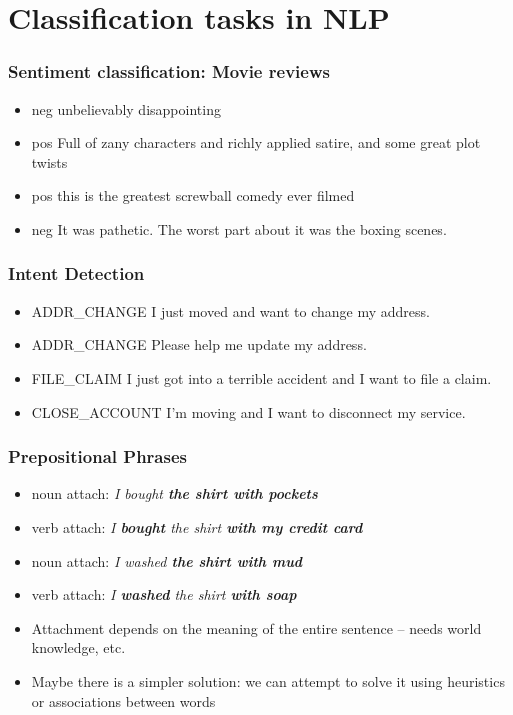 





\section{Classification tasks in NLP}
\frame{\tableofcontents[currentsection]}

\begin{frame}
\frametitle{Sentiment classification: Movie reviews}
\begin{itemize}
\item {\color{red} neg} unbelievably disappointing 
\item {\color{green} pos} Full of zany characters and richly applied satire, and some great plot twists
\item {\color{green} pos} this is the greatest screwball comedy ever filmed  
\item {\color{red} neg} It was pathetic. The worst part about it was the boxing scenes.
\end{itemize}
\end{frame}

\begin{frame}
\frametitle{Intent Detection}
\begin{itemize}
\item {\color{blue} ADDR\_CHANGE} I just moved and want to change my address. 
\item {\color{blue} ADDR\_CHANGE} Please help me update my address.  
\item {\color{blue} FILE\_CLAIM} I just got into a terrible accident and I want to file a claim. 
\item {\color{blue} CLOSE\_ACCOUNT} I'm moving and I want to disconnect my service.
\end{itemize}
\end{frame}

\begin{frame}
\frametitle{Prepositional Phrases}
\begin{itemize}[<+->]
\item noun attach: {\em I bought \textbf{the shirt with pockets}}
\item verb attach: {\em I \textbf{bought} the shirt \textbf{with my credit card}}
\item noun attach: {\em I washed \textbf{the shirt with mud}}
\item verb attach: {\em I \textbf{washed} the shirt \textbf{with soap}}
\item Attachment depends on the meaning of the entire sentence -- needs world knowledge, etc.
\item Maybe there is a simpler solution: we can attempt to solve it using heuristics or associations between words
\end{itemize}
\end{frame}

